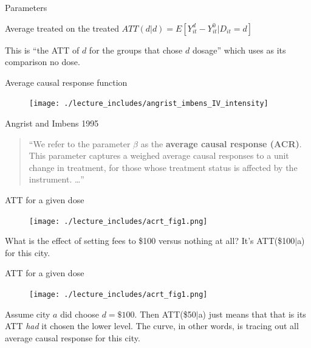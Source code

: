 \documentclass{beamer}
\begin{document}
\begin{frame}{Parameters}

\begin{block}{Average treated on the treated}
$ATT(d|d) = E[Y^d_{it} - Y^0_{it} | D_{it}=d]$
\end{block}

\bigskip

This is ``the ATT of $d$ for the groups that chose $d$ dosage'' which uses as its comparison no dose.

\end{frame}

\begin{frame}{Average causal response function}

\begin{figure}
\begin{center}
             \texttt{[image: ./lecture\_includes/angrist\_imbens\_IV\_intensity]}
\end{center}
\end{figure}

\end{frame}


\begin{frame}{Angrist and Imbens 1995}

\begin{quote}
``We refer to the parameter $\beta$ as the \textbf{average causal response (ACR)}. This parameter captures a weighed average causal responses to a unit change in treatment, for those whose treatment status is affected by the instrument. \dots ''
\end{quote}

\end{frame}


\begin{frame}{ATT for a given dose}

\begin{figure}
\begin{center}
             \texttt{[image: ./lecture\_includes/acrt\_fig1.png]}
\end{center}
\end{figure}

What is the effect of setting fees to \$100 versus nothing at all? It's ATT(\$100$|$a) for this city.


\end{frame}

\begin{frame}{ATT for a given dose}

\begin{figure}
\begin{center}
             \texttt{[image: ./lecture\_includes/acrt\_fig1.png]}
\end{center}
\end{figure}

Assume city $a$ did choose $d=\$100$. Then ATT(\$50$|$a) just means that that is its ATT \emph{had} it chosen the lower level.  The curve, in other words, is tracing out all average causal response for this city.


\end{frame}
\end{document}
